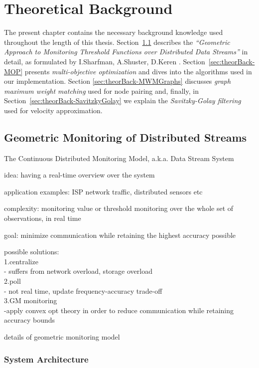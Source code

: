 \chapter{Theoretical Background} \label{chap:theorBack}

The present chapter contains the necessary background knowledge used throughout the length of this thesis. Section~\ref{sec:theorBack-GM} describes the \emph{``Geometric Approach to Monitoring Threshold Functions over Distributed Data Streams''} in detail, as formulated by I.Sharfman, A.Shuster, D.Keren \cite{GM-sharfmanShusterKeren}. Section~\ref{sec:theorBack-MOP} presents \emph{multi-objective optimization} and  dives into the algorithms used in our implementation. Section \ref{sec:theorBack-MWMGraphs} discusses \emph{graph maximum weight matching} used for node pairing and, finally, in Section~\ref{sec:theorBack-SavitzkyGolay} we explain the \emph{Savitzky-Golay filtering} used for velocity approximation.

\section{Geometric Monitoring of Distributed Streams} \label{sec:theorBack-GM}

The Continuous Distributed Monitoring Model, a.k.a. Data Stream System

idea: having a real-time overview over the system

application examples: ISP network traffic, distributed sensors etc

complexity: monitoring value or threshold monitoring over the whole set of observations, in real time

goal: minimize communication while retaining the highest accuracy possible

possible solutions:\\
	1.centralize\\
		- suffers from network overload, storage overload\\
	2.poll\\
		- not real time, update frequency-accuracy trade-off\\
	3.GM monitoring\\
	    -apply convex opt theory in order to reduce communication while retaining accuracy bounds

details of geometric monitoring model

\subsection{System Architecture} \label{subsec:theorBack-GM-sysArch}

